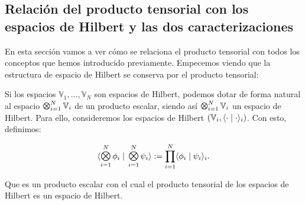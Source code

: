 \subsection{Relación del producto tensorial con los espacios de Hilbert y las dos caracterizaciones}

En esta sección vamos a ver cómo se relaciona el producto tensorial con todos los conceptos que hemos introducido previamente. Empecemos viendo que la estructura de espacio de Hilbert se conserva por el producto tensorial:

\begin{proposicion}

    Si los espacios $\mathbb{V}_1, \ldots, \mathbb{V}_N$ son espacios de Hilbert, podemos dotar de forma natural al espacio $\MediumOtimes_{i = 1}^N \mathbb{V}_i$ de un producto escalar, siendo así $\MediumOtimes_{i = 1}^N \mathbb{V}_i$ un espacio de Hilbert. Para ello, consideremos los espacios de Hilbert  $(\mathbb{V}_i, \langle \cdot \; | \; \cdot \rangle_i)$. Con esto, definimos:

    \begin{equation}
        \innerproduct{\MediumOtimes_{i = 1}^{N} \phi_i}{\MediumOtimes_{i = 1}^{N} \psi_i} := \prod_{i = 1}^{N} \innerproduct{\phi_i}{\psi_i}_i.
    \end{equation}

    Que es un producto escalar con el cual el producto tensorial de los espacios de Hilbert es un espacio de Hilbert.

\end{proposicion}

